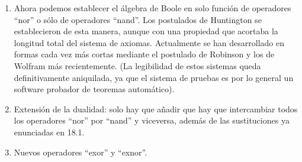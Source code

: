 \documentclass[
]{article}
\providecommand{\tightlist}{%
  \setlength{\itemsep}{0pt}\setlength{\parskip}{0pt}}
\begin{document}
\begin{enumerate}
\begin{enumerate}
\begin{enumerate}
      \begin{enumerate}
      \def\labelenumiv{\arabic{enumiv}.}
      \item
        ``NOR'':

        \begin{enumerate}
        \def\labelenumv{\arabic{enumv}.}
        \tightlist
        \item
          \[{{x + y} = {({x@y})}}@{({x@y})}\]
        \item
          \[{x \cdot y} = {({{({x@x})}@{({y@y})}})}\]
        \item
          \[\overline{x} = {x@x}\]
        \end{enumerate}
      \item
        ``NAND'':

        \begin{enumerate}
        \def\labelenumv{\arabic{enumv}.}
        \tightlist
        \item
          \[{{x \cdot y} = {({x@y})}}@{({x@y})}\]
        \item
          \[{{x + y} = {({x@x})}}@{({y@y})}\]
        \item
          \[\overline{x} = {x@x}\]
        \end{enumerate}
      \end{enumerate}
    \item
      Ahora podemos establecer el álgebra de Boole en solo función de
      operadores ``nor'' o sólo de operadores ``nand''. Los postulados
      de Huntington se establecieron de esta manera, aunque con una
      propiedad que acortaba la longitud total del sistema de axiomas.
      Actualmente se han desarrollado en formas cada vez más cortas
      mediante el postulado de Robinson y los de Wolfram más
      recientemente. (La legibilidad de estos sistemas queda
      definitivamente aniquilada, ya que el sistema de pruebas es por lo
      general un software probador de teoremas automático).
    \item
      Extensión de la dualidad: solo hay que añadir que hay que
      intercambiar todos los operadores ``nor'' por ``nand'' y
      viceversa, además de las sustituciones ya enunciadas en 18.1.
    \item
      Nuevos operadores ``exor'' y ``exnor''.


\end{enumerate}
\end{enumerate}
\end{enumerate}
\end{document}
